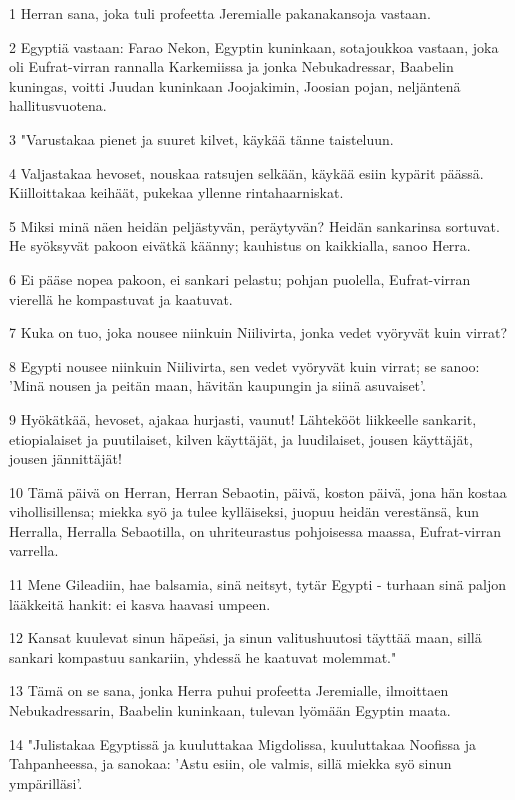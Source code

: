\par 1 Herran sana, joka tuli profeetta Jeremialle pakanakansoja vastaan.
\par 2 Egyptiä vastaan: Farao Nekon, Egyptin kuninkaan, sotajoukkoa vastaan, joka oli Eufrat-virran rannalla Karkemiissa ja jonka Nebukadressar, Baabelin kuningas, voitti Juudan kuninkaan Joojakimin, Joosian pojan, neljäntenä hallitusvuotena.
\par 3 "Varustakaa pienet ja suuret kilvet, käykää tänne taisteluun.
\par 4 Valjastakaa hevoset, nouskaa ratsujen selkään, käykää esiin kypärit päässä. Kiilloittakaa keihäät, pukekaa yllenne rintahaarniskat.
\par 5 Miksi minä näen heidän peljästyvän, peräytyvän? Heidän sankarinsa sortuvat. He syöksyvät pakoon eivätkä käänny; kauhistus on kaikkialla, sanoo Herra.
\par 6 Ei pääse nopea pakoon, ei sankari pelastu; pohjan puolella, Eufrat-virran vierellä he kompastuvat ja kaatuvat.
\par 7 Kuka on tuo, joka nousee niinkuin Niilivirta, jonka vedet vyöryvät kuin virrat?
\par 8 Egypti nousee niinkuin Niilivirta, sen vedet vyöryvät kuin virrat; se sanoo: 'Minä nousen ja peitän maan, hävitän kaupungin ja siinä asuvaiset'.
\par 9 Hyökätkää, hevoset, ajakaa hurjasti, vaunut! Lähtekööt liikkeelle sankarit, etiopialaiset ja puutilaiset, kilven käyttäjät, ja luudilaiset, jousen käyttäjät, jousen jännittäjät!
\par 10 Tämä päivä on Herran, Herran Sebaotin, päivä, koston päivä, jona hän kostaa vihollisillensa; miekka syö ja tulee kylläiseksi, juopuu heidän verestänsä, kun Herralla, Herralla Sebaotilla, on uhriteurastus pohjoisessa maassa, Eufrat-virran varrella.
\par 11 Mene Gileadiin, hae balsamia, sinä neitsyt, tytär Egypti - turhaan sinä paljon lääkkeitä hankit: ei kasva haavasi umpeen.
\par 12 Kansat kuulevat sinun häpeäsi, ja sinun valitushuutosi täyttää maan, sillä sankari kompastuu sankariin, yhdessä he kaatuvat molemmat."
\par 13 Tämä on se sana, jonka Herra puhui profeetta Jeremialle, ilmoittaen Nebukadressarin, Baabelin kuninkaan, tulevan lyömään Egyptin maata.
\par 14 "Julistakaa Egyptissä ja kuuluttakaa Migdolissa, kuuluttakaa Noofissa ja Tahpanheessa, ja sanokaa: 'Astu esiin, ole valmis, sillä miekka syö sinun ympärilläsi'.
